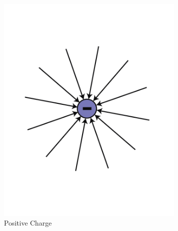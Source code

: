 \begin{figure}[htbp]
  \centering
  \begin{subfigure}[b]{0.3\textwidth}
      \includegraphics[width=\textwidth]{Images/11.4a}
      \caption{Positive Charge}
      \label{fig:11.4a}
  \end{subfigure}
  \begin{subfigure}[b]{0.3\textwidth}

\end{subfigure}
\end{figure}
